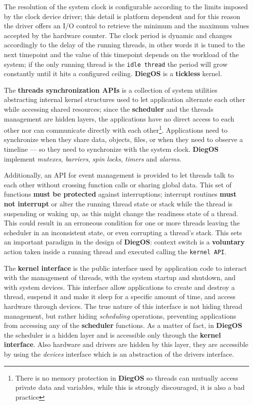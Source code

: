 \documentclass[11pt,b5paper]{scrbook}
\newcommand{\myOS}{{\color{SteelBlue}\textbf{DiegOS}}}
\begin{document}
The resolution of the system clock is configurable according to the limits imposed
by the clock device driver; this detail is platform dependent and for this reason the driver
offers an I/O control to retrieve the minimum and the maximum values accepted by the hardware counter.
The clock period is dynamic and changes accordingly to the delay of the running threads,
in other words it is tuned to the next timepoint and the value of this timepoint
depends on the workload of the system; if the only running thread is the \texttt{idle thread}
the period will grow constantly until it hits a configured ceiling.
{\myOS} is a \textbf{tickless} kernel.

The \textbf{threads synchronization APIs}
is a collection of system utilities abstracting
internal kernel structures used to let application alternate each other while accessing
shared resources;
since the \textbf{scheduler} and the threads management are hidden layers, the applications 
have no direct access to each other nor can communicate directly with each
other\footnote{There is no memory protection in {\myOS} so threads can mutually
access private data and variables, while this is strongly discouraged, it is also a
bad practice}.
Applications need to synchronize when they share data, objects, files, or when
they need to observe a timeline --- so they need to synchronize with the
system clock.
{\myOS} implement \textit{mutexes}, \textit{barriers}, \textit{spin locks}, \textit{timers}
and \textit{alarms}.

Additionally, an API for event management is provided to let threads talk to
each other without crossing function calls or sharing global data.
This set of functions \textbf{must be protected} against interruptions;
interrupt routines \textbf{must not interrupt} or alter the running thread state or
stack while the thread is suspending or waking up, as this might change the
readiness state of a thread.
This could result in an erroneous condition for one or more threads leaving the scheduler
in an inconsistent state, or even corrupting a thread's stack.
This sets an important paradigm in the design of {\myOS}: context switch is a \textbf{voluntary}
action taken inside a running thread and executed calling the \texttt{kernel API}.

The \textbf{kernel interface}
is the public interface used by application code
to interact with the management of threads, with the system startup and
shutdown, and with system devices.
This interface allow applications to create and destroy a thread, suspend it
and make it sleep for a specific amount of time, and access hardware through
devices.
The true nature of this interface is not hiding thread management, but rather
hiding \textit{scheduling} operations, preventing applications from accessing
any of the \textbf{scheduler} functions.
As a matter of fact, in {\myOS} the scheduler is a hidden layer and is
accessible  only through the \textbf{kernel interface}.
Also hardware and drivers are hidden by this layer, they are accessible by
using the \textit{devices} interface which is an abstraction of the drivers
interface.
\end{document}
